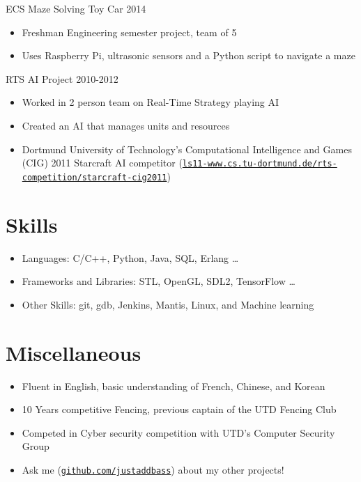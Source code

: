 \documentclass[line,margin]{res}
\begin{document}
\begin{resume}
\vspace{-8pt}
ECS Maze Solving Toy Car
\hfill 2014
	\begin{itemize} \itemsep -2pt
	\item Freshman Engineering semester project, team of 5
	\item Uses Raspberry Pi, ultrasonic sensors and a Python script to navigate a maze
	\end{itemize}

\vspace{-8pt}
RTS AI Project
\hfill 2010-2012
\begin{itemize} \itemsep -2pt
	\item Worked in 2 person team on Real-Time Strategy playing AI
	\item Created an AI that manages units and resources
	\item Dortmund University of Technology’s Computational Intelligence and Games (CIG) 2011 Starcraft AI
	competitor (\href{http://ls11-www.cs.tu-dortmund.de/rts-competition/starcraft-cig2011}{\texttt{ls11-www.cs.tu-dortmund.de/rts-competition/starcraft-cig2011}})
\end{itemize}

\vspace{-4pt}
\section{Skills}
\vspace{22pt}
	\begin{itemize} \itemsep -2pt
		\item Languages: C/C++, Python, Java, SQL, Erlang \ldots
		\item Frameworks and Libraries: STL, OpenGL, SDL2, TensorFlow \ldots
		\item Other Skills: git, gdb, Jenkins, Mantis, Linux, and Machine learning
	\end{itemize}

\vspace{-4pt}
\section{Miscellaneous}
\vspace{22pt}
	\begin{itemize} \itemsep -2pt
	\item Fluent in English, basic understanding of French, Chinese, and Korean
	\item 10 Years competitive Fencing, previous captain of the UTD Fencing Club
	\item Competed in Cyber security competition with UTD's Computer Security Group
	\item Ask me (\href{https://github.com/justaddbass}{\texttt{github.com/justaddbass}}) about my other projects!
	\end{itemize}

\end{resume}
\end{document}
